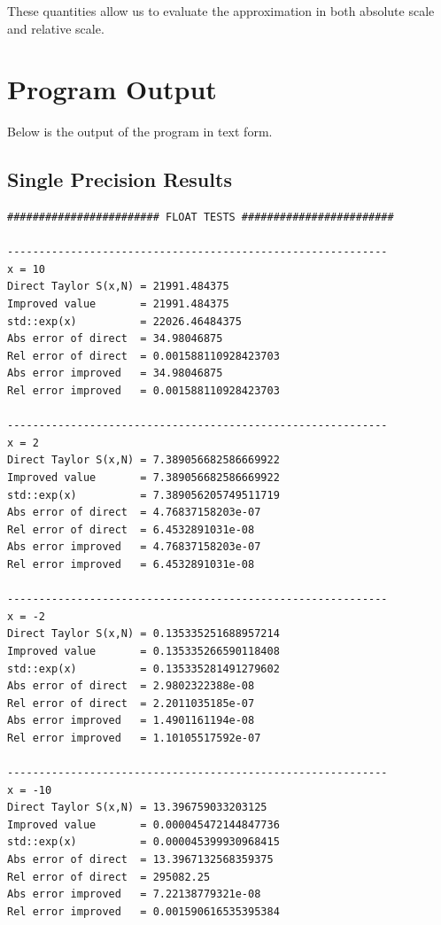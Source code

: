 \documentclass[12pt,a4paper]{article}
\begin{document}
These quantities allow us to evaluate the approximation in both absolute scale and relative scale.

\section{Program Output}

Below is the output of the program in text form.

\subsection*{Single Precision Results}

\begin{lstlisting}
######################## FLOAT TESTS ########################

------------------------------------------------------------
x = 10
Direct Taylor S(x,N) = 21991.484375
Improved value       = 21991.484375
std::exp(x)          = 22026.46484375
Abs error of direct  = 34.98046875
Rel error of direct  = 0.001588110928423703
Abs error improved   = 34.98046875
Rel error improved   = 0.001588110928423703

------------------------------------------------------------
x = 2
Direct Taylor S(x,N) = 7.389056682586669922
Improved value       = 7.389056682586669922
std::exp(x)          = 7.389056205749511719
Abs error of direct  = 4.76837158203e-07
Rel error of direct  = 6.4532891031e-08
Abs error improved   = 4.76837158203e-07
Rel error improved   = 6.4532891031e-08

------------------------------------------------------------
x = -2
Direct Taylor S(x,N) = 0.135335251688957214
Improved value       = 0.135335266590118408
std::exp(x)          = 0.135335281491279602
Abs error of direct  = 2.9802322388e-08
Rel error of direct  = 2.2011035185e-07
Abs error improved   = 1.4901161194e-08
Rel error improved   = 1.10105517592e-07

------------------------------------------------------------
x = -10
Direct Taylor S(x,N) = 13.396759033203125
Improved value       = 0.000045472144847736
std::exp(x)          = 0.000045399930968415
Abs error of direct  = 13.3967132568359375
Rel error of direct  = 295082.25
Abs error improved   = 7.22138779321e-08
Rel error improved   = 0.001590616535395384
\end{lstlisting}
\end{document}
